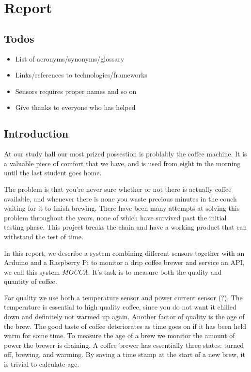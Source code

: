\documentclass[12pt,a4paper,oneside,article]{memoir}
\numberwithin{equation}{chapter}
\begin{document}
\clearpage

\chapter{Report}
\section*{Todos}
\begin{itemize}
\item List of acronyms/synonyms/glossary
\item Links/references to technologies/frameworks
\item Sensors requires proper names and so on
\item Give thanks to everyone who has helped
\end{itemize}

\section{Introduction}\label{sec:introduction}
At our study hall our most prized possestion is problably the coffee 
machine. It is a valuable piece of comfort that we have, and is used from eight 
in the morning until the last student goes home.

The problem is that you're never sure whether or not there is actually coffee
available, and whenever there is none you waste precious minutes in the couch
waiting for it to finish brewing. There have been many attempts at solving this
problem throughout the years, none of which have survived past the initial
testing phase. This project breaks the chain and have a working product that can
withstand the test of time.

In this report, we describe a system combining different sensors together with
an Arduino and a Raspberry Pi to monitor a drip coffee brewer and service an
API, we call this system \textit{MOCCA}. It's task is to measure both the
quality and quantity of coffee.

For quality we use both a temperature sensor and power current sensor (?). The
temperature is essential to high quality coffee, since you do not want it
chilled down and definitely not warmed up again. Another factor of quality is
the age of the brew. The good taste of coffee deteriorates as time goes on if it
has been held warm for some time. To measure the age of a brew we monitor the
amount of power the brewer is draining. A coffee brewer has essentially three
states: turned off, brewing, and warming. By saving a time stamp at the start of
a new brew, it is trivial to calculate age.
\end{document}
